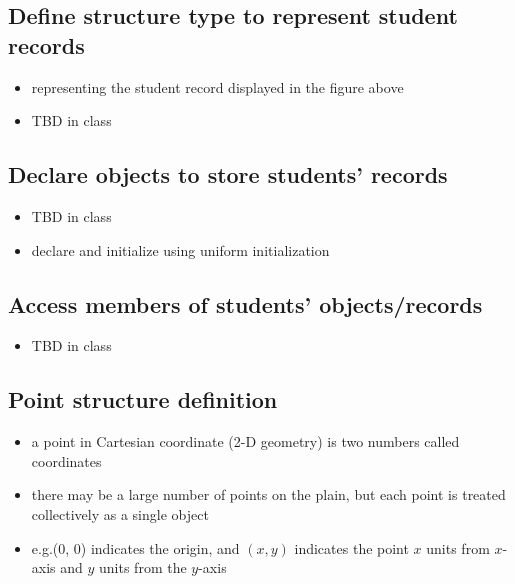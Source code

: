 \documentclass[11pt]{article}
\providecommand{\tightlist}{%
      \setlength{\itemsep}{0pt}\setlength{\parskip}{0pt}}
\begin{document}
    \hypertarget{define-structure-type-to-represent-student-records}{%
\subsection{Define structure type to represent student
records}\label{define-structure-type-to-represent-student-records}}

\begin{itemize}
\tightlist
\item
  representing the student record displayed in the figure above
\item
  TBD in class
\end{itemize}

    \hypertarget{declare-objects-to-store-students-records}{%
\subsection{Declare objects to store students'
records}\label{declare-objects-to-store-students-records}}

\begin{itemize}
\tightlist
\item
  TBD in class
\item
  declare and initialize using uniform initialization
\end{itemize}

    \hypertarget{access-members-of-students-objectsrecords}{%
\subsection{Access members of students'
objects/records}\label{access-members-of-students-objectsrecords}}

\begin{itemize}
\tightlist
\item
  TBD in class
\end{itemize}

    \hypertarget{point-structure-definition}{%
\subsection{Point structure
definition}\label{point-structure-definition}}

\begin{itemize}
\tightlist
\item
  a point in Cartesian coordinate (2-D geometry) is two numbers called
  coordinates
\item
  there may be a large number of points on the plain, but each point is
  treated collectively as a single object
\item
  e.g.(0, 0) indicates the origin, and \((x, y)\) indicates the point
  \(x\) units from \(x\)-axis and \(y\) units from the \(y\)-axis
\end{itemize}
\end{document}
